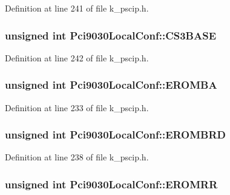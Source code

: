 Definition at line 241 of file k\_\-pscip.h.\hypertarget{struct_pci9030_local_conf_6a18709959d62d7938926f7e51c3ae6d}{
\subsubsection[{CS3BASE}]{\setlength{\rightskip}{0pt plus 5cm}unsigned int {\bf Pci9030LocalConf::CS3BASE}}}
\label{struct_pci9030_local_conf_6a18709959d62d7938926f7e51c3ae6d}




Definition at line 242 of file k\_\-pscip.h.\hypertarget{struct_pci9030_local_conf_aa0b54e90b9f628fc5249c2c82bcddcf}{
\subsubsection[{EROMBA}]{\setlength{\rightskip}{0pt plus 5cm}unsigned int {\bf Pci9030LocalConf::EROMBA}}}
\label{struct_pci9030_local_conf_aa0b54e90b9f628fc5249c2c82bcddcf}




Definition at line 233 of file k\_\-pscip.h.\hypertarget{struct_pci9030_local_conf_e09a3ce001edf7b515717ca2b15dbe8d}{
\subsubsection[{EROMBRD}]{\setlength{\rightskip}{0pt plus 5cm}unsigned int {\bf Pci9030LocalConf::EROMBRD}}}
\label{struct_pci9030_local_conf_e09a3ce001edf7b515717ca2b15dbe8d}




Definition at line 238 of file k\_\-pscip.h.\hypertarget{struct_pci9030_local_conf_640a1160fa5f4af692887dc7f404853a}{
\subsubsection[{EROMRR}]{\setlength{\rightskip}{0pt plus 5cm}unsigned int {\bf Pci9030LocalConf::EROMRR}}}
\label{struct_pci9030_local_conf_640a1160fa5f4af692887dc7f404853a}





